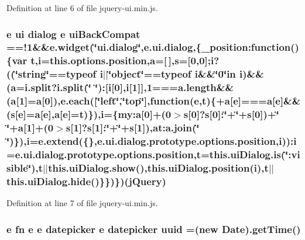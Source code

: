 {{Definition at line 6 of file jquery-\/ui.\+min.\+js.

\subsubsection[{\texorpdfstring{ui\+Back\+Compat}{uiBackCompat}}]{ {\bf e} {\bf ui} dialog {\bf e} ui\+Back\+Compat ==!1\&\&{\bf e.\+widget}(\char`\"{}ui.\+dialog\char`\"{},e.\+ui.\+dialog,\{\+\_\+position\+:function()\{var {\bf t},{\bf i}={\bf this.\+options.\+position},{\bf a}=\mbox{[}$\,$\mbox{]},{\bf s}=\mbox{[}0,0\mbox{]};{\bf i}?((\char`\"{}string\char`\"{}==typeof {\bf i}$\vert$$\vert$\char`\"{}object\char`\"{}==typeof {\bf i}\&\&\char`\"{}0\char`\"{}in {\bf i})\&\&({\bf a}=i.\+split?i.\+split(\char`\"{} \char`\"{})\+:\mbox{[}{\bf i}\mbox{[}0\mbox{]},{\bf i}\mbox{[}1\mbox{]}\mbox{]},1===a.\+length\&\&({\bf a}\mbox{[}1\mbox{]}={\bf a}\mbox{[}0\mbox{]}),{\bf e.\+each}(\mbox{[}\char`\"{}left\char`\"{},\char`\"{}top\char`\"{}\mbox{]},function({\bf e},{\bf t})\{+{\bf a}\mbox{[}{\bf e}\mbox{]}==={\bf a}\mbox{[}{\bf e}\mbox{]}\&\&({\bf s}\mbox{[}{\bf e}\mbox{]}={\bf a}\mbox{[}{\bf e}\mbox{]},{\bf a}\mbox{[}{\bf e}\mbox{]}={\bf t})\}),{\bf i}=\{my\+:a\mbox{[}0\mbox{]}+(0$>${\bf s}\mbox{[}0\mbox{]}?{\bf s}\mbox{[}0\mbox{]}\+:\char`\"{}+\char`\"{}+{\bf s}\mbox{[}0\mbox{]})+\char`\"{} \char`\"{}+{\bf a}\mbox{[}1\mbox{]}+(0$>${\bf s}\mbox{[}1\mbox{]}?{\bf s}\mbox{[}1\mbox{]}\+:\char`\"{}+\char`\"{}+{\bf s}\mbox{[}1\mbox{]}),at\+:a.\+join(\char`\"{} \char`\"{})\}),{\bf i}={\bf e.\+extend}(\{\},{\bf e.\+ui.\+dialog.\+prototype.\+options.\+position},{\bf i}))\+:{\bf i}={\bf e.\+ui.\+dialog.\+prototype.\+options.\+position},{\bf t}=this.\+ui\+Dialog.\+is(\char`\"{}\+:visible\char`\"{}),t$\vert$$\vert$this.\+ui\+Dialog.\+show(),{\bf this.\+ui\+Dialog.\+position}({\bf i}),{\bf t}$\vert$$\vert$this.\+ui\+Dialog.\+hide()\}\})\})({\bf j\+Query})}\hypertarget{jquery-ui_8min_8js_ada474cf1b2ba1614ffef931ba3a389a8}{}\label{jquery-ui_8min_8js_ada474cf1b2ba1614ffef931ba3a389a8}


Definition at line 7 of file jquery-\/ui.\+min.\+js.

\subsubsection[{\texorpdfstring{uuid}{uuid}}]{ {\bf e} {\bf fn} {\bf e} {\bf e} {\bf datepicker} {\bf e} {\bf datepicker} uuid =(new Date).get\+Time()}\hypertarget{jquery-ui_8min_8js_a34f69966de994bffbc131b960d8cc7f8}{}\label{jquery-ui_8min_8js_a34f69966de994bffbc131b960d8cc7f8}


}}
